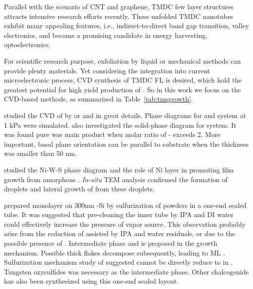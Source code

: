 Parallel with the scenario of CNT and graphene, TMDC few layer structures attracts intensive research efforts recently. These unfolded TMDC nanotubes exhibit many appealing features, i.e., indirect-to-direct band gap transition,\cite{Splendiani2010} valley electronics, and become a promising candidate in energy harvesting, optoelectronics.

For scientific research purpose, exfoliation by liquid \cite{Smith2011} or mechanical methods \cite{Lee2010a} can provide plenty materials. Yet considering the integration into current microelectronic process, CVD synthesis of TMDC FL is desired, which hold the greatest potential for high yield production of . So in this work we focus on the CVD-based methods, as summarized in Table~\ref{tab:tmsgrowth}.

\citeauthor{Lee1994} studied the CVD of  by  or  and  in great details. Phase diagrams for  and  system at 1 kPa were simulated. \citeauthor{Endler1999} also investigated the solid-phase diagram for  system.\cite{Endler1999} It was found pure  was main product when molar ratio of - exceeds 2. More important,  basal plane orientation can be parallel to substrate when the thickness was smaller than 50 nm.

\citeauthor{Regula1997} studied the Ni-W-S phase diagram and the role of Ni layer in promoting  film growth from amorphous .\cite{Regula1997} \emph{In-situ} TEM analysis confirmed the formation of  droplets and lateral growth of  from these droplets. \cite{Regula1998}

\citeauthor{Cong2013} prepared monolayer  on 300nm -Si by sulfurization of  powders in a one-end sealed tube.\cite{Cong2013} It was suggested that pre-cleaning the inner tube by IPA and DI water could effectively increase the pressure of vapor source. This observation probably arise from the reduction of  assisted by IPA and water residuals, or due to the possible presence of . Intermediate phase  and  is proposed in the growth mechanism. Possible thick  flakes decompose subsequently, leading to ML . Sulfurization mechanism study of  suggested  cannot be directly reduce to  in .\cite{VanderVlies2002,VanderVlies2002a} Tungsten oxysulfides was necessary as the intermediate phase. Other chalcogenide has also been synthesized using this one-end sealed layout.\cite{Mukherjee2013}

